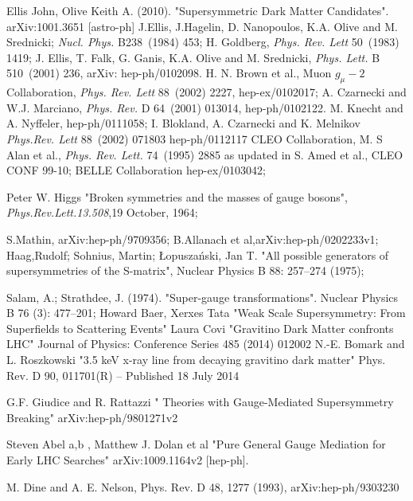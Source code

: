 \begin{thebibliography}{9}
 Ellis John, Olive Keith A. (2010). "Supersymmetric Dark Matter Candidates". arXiv:1001.3651 [astro-ph]
 J.Ellis, J.Hagelin, D. Nanopoulos, K.A. Olive and M. Srednicki; \emph{Nucl. Phys.} B238~(1984) 453; H. Goldberg, \emph{Phys. Rev. Lett} 50~(1983) 1419;
J. Ellis, T. Falk, G. Ganis, K.A. Olive and M. Srednicki, \emph{Phys. Lett.} B 510~(2001) 236, arXiv: hep-ph/0102098.
H. N. Brown et al., Muon $g_{\mu}-2$ Collaboration, \emph{Phys. Rev. Lett} 88~(2002) 2227, hep-ex/0102017; A. Czarnecki and W.J. Marciano,
\emph{ Phys. Rev.} D 64~(2001) 013014, hep-ph/0102122.
 M. Knecht and A. Nyffeler, hep-ph/0111058; I. Blokland, A. Czarnecki and K. Melnikov \emph{Phys.Rev. Lett} 88~(2002) 071803 hep-ph/0112117
CLEO Collaboration, M. S Alan et al., \emph{Phys. Rev. Lett.} 74~(1995) 2885 as updated in S. Amed et al., CLEO CONF 99-10; 
 BELLE Collaboration hep-ex/0103042;

 Peter W. Higgs "Broken symmetries and the masses of gauge bosons", \emph{Phys.Rev.Lett.13.508},19 October, 1964;

 S.Mathin, arXiv:hep-ph/9709356;
 B.Allanach et al,arXiv:hep-ph/0202233v1;
 Haag,Rudolf; Sohnius, Martin; Łopuszański, Jan T. "All possible generators of supersymmetries of the S-matrix", Nuclear Physics B 88: 257–274 (1975);

 Salam, A.; Strathdee, J. (1974). "Super-gauge transformations". Nuclear Physics B 76 (3): 477–201;
 Howard Baer, Xerxes Tata "Weak Scale Supersymmetry: From Superfields to Scattering Events"
Laura Covi "Gravitino Dark Matter confronts LHC" Journal of Physics: Conference Series 485 (2014) 012002
 N.-E. Bomark and L. Roszkowski "3.5 keV x-ray line from decaying gravitino dark matter" Phys. Rev. D 90, 011701(R) – Published 18 July 2014

G.F. Giudice and R. Rattazzi " Theories with Gauge-Mediated Supersymmetry Breaking" arXiv:hep-ph/9801271v2

 Steven Abel a,b , Matthew J. Dolan et al "Pure General Gauge Mediation for Early LHC Searches"  arXiv:1009.1164v2 [hep-ph].

M. Dine and A. E. Nelson, Phys. Rev. D 48, 1277
(1993), arXiv:hep-ph/9303230


\end{thebibliography}
